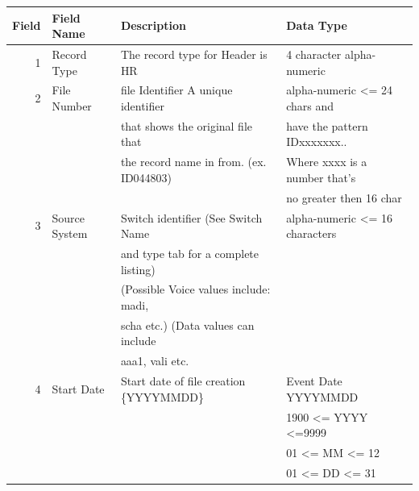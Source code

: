 \documentclass[12pt,twoside]{article}
\begin{document}
\footnotesize

\begin{center}
\begin{tabular}{rlll}
\hline
 \textbf{Field}  &  \textbf{Field Name}  &  \textbf{Description}                       &  \textbf{Data Type}              \\
\hline
              1  &  Record Type          &  The record type for Header is HR           &  4 character alpha-numeric       \\
              2  &  File Number          &  file Identifier A unique identifier        &  alpha-numeric <= 24 chars and   \\
                 &                       &  that shows the original file that          &  have the pattern IDxxxxxxx..    \\
                 &                       &  the record name in from. (ex. ID044803)    &  Where xxxx is a number that's   \\
                 &                       &                                             &  no greater then 16 char         \\
              3  &  Source System        &  Switch identifier  (See Switch Name        &  alpha-numeric <= 16 characters  \\
                 &                       &  and type tab for a complete listing)       &                                  \\
                 &                       &  (Possible Voice values include: madi,      &                                  \\
                 &                       &  scha etc.) (Data values can include        &                                  \\
                 &                       &  aaa1, vali etc.                            &                                  \\
              4  &  Start Date           &  Start date of file creation \{YYYYMMDD\}   &  Event Date YYYYMMDD             \\
                 &                       &                                             &  1900 <= YYYY <=9999             \\
                 &                       &                                             &  01 <= MM <= 12                  \\
                 &                       &                                             &  01 <= DD <= 31                  \\

\end{tabular}
\end{center}
\end{document}
